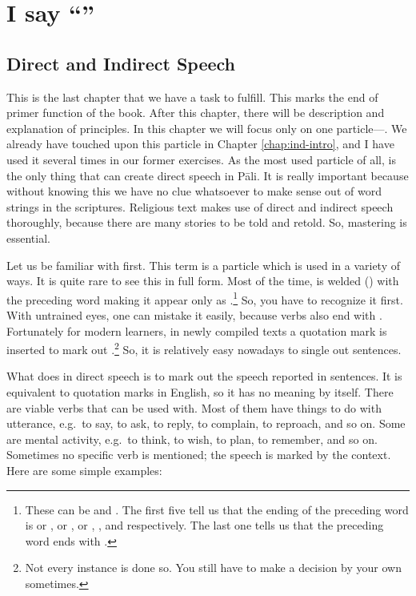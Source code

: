 \chapter{I say ``''}\label{chap:iti}

{}
\section*{Direct and Indirect Speech}

This is the last chapter that we have a task to fulfill. This marks the end of primer function of the book. After this chapter, there will be description and explanation of principles. In this chapter we will focus only on one particle---. We already have touched upon this particle in Chapter \ref{chap:ind-intro}, and I have used it several times in our former exercises. As the most used particle of all,  is the only thing that can create direct speech in P\=ali. It is really important because without knowing this we have no clue whatsoever to make sense out of word strings in the scriptures. Religious text makes use of direct and indirect speech thoroughly, because there are many stories to be told and retold. So, mastering  is essential.

Let us be familiar with  first. This term is a particle which is used in a variety of ways. It is quite rare to see this in full form. Most of the time,  is welded () with the preceding word making it appear only as .\footnote{These can be  and . The first five tell us that the ending of the preceding word is  or ,  or ,  or , , and  respectively. The last one tells us that the preceding word ends with .} So, you have to recognize it first. With untrained eyes, one can mistake it easily, because verbs also end with . Fortunately for modern learners, in newly compiled texts a quotation mark is inserted to mark out .\footnote{Not every instance is done so. You still have to make a decision by your own sometimes.} So, it is relatively easy nowadays to single out  sentences.

What  does in direct speech is to mark out the speech reported in sentences. It is equivalent to quotation marks in English, so it has no meaning by itself. There are viable verbs that  can be used with. Most of them have things to do with utterance, e.g.\ to say, to ask, to reply, to complain, to reproach, and so on. Some are mental activity, e.g.\ to think, to wish, to plan, to remember, and so on. Sometimes no specific verb is mentioned; the speech is marked by the context. Here are some simple examples:


